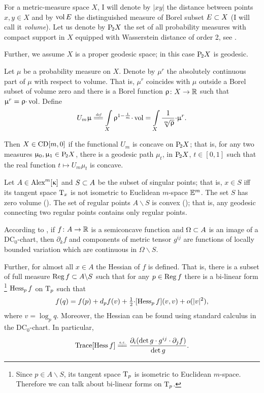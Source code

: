 \documentclass[oneside,a4paper]{article}
\begin{document}
For a metric-measure space $X$, 
I will denote 
by $|x y|$ the distance between points $x,y\in X$
and by $\mathop{\rm vol}\nolimits E$ the distinguished measure of Borel subset $E\subset X$ (I will call it \emph{volume}).
Let us denote by $\mathrm {P}_{\!2} X$ the set of all probability measures with compact support in $X$ equipped with Wasserstein distance of order 2, see \cite[6.1]{villani}.

Further, we assume $X$ is a proper geodesic space;
in this case $\mathrm {P}_{\!2} X$ is geodesic.

Let $\mu$ be a probability measure on $X$.
Denote by $\mu^{r}$ the absolutely continuous part of $\mu$ with respect to volume.
That is, 
$\mu^{r}$ coincides with $\mu$ outside a Borel subset of volume zero and
 there is a Borel function $\upvarrho\colon X\to\mathbb{R}$ such that $\mu^{r}\z=\rho{\cdot}\vol$.
Define
$$U_m\mu
\df
\int\limits_X\rho^{1-\frac1m}{\cdot}\vol
=
\int\limits_X\frac1{\sqrt[m]{\rho}}{\cdot}\mu^r.$$

Then $X\in \CD m0$ if the functional $U_m$ is concave on  $\mathrm {P}_{\!2} X$;
that is, for any two measures $\upmu_0,\upmu_1\in \mathrm {P}_{\!2} X$,
there is a geodesic path $\mu_t$, in $\mathrm {P}_{\!2} X$, $t\in[0,1]$ such that the real function $t\mapsto U_m\mu_t$ is concave.



Let $A\in\CBB m\kappa$ and $S\subset A$ be the subset of singular points;
that is, $x\in S$ iff its tangent space $\text{\rm T}_x$ is not isometric to Euclidean $m$-space $\mathbb{E}^m$. 
The set $S$ has zero volume (\cite[10.6]{BGP}).
The set of regular points $A\backslash S$ is convex (\cite{petrunin:parallel}); 
that is, any geodesic connecting two regular points contains only regular points.

According to \cite{perelman:DC},  
if $f\colon A\to\mathbb{R}$ is a semiconcave function 
and $\Omega\subset A$ is an image of a $\mathrm{DC}_0$-chart,
then
$\partial_k f$ and components of metric tensor $g^{i j}$ are functions of locally bounded variation which are continuous in $\Omega\backslash S$.

Further, for almost all $x\in A$ the Hessian of $f$ is defined.
That is, there is a subset of full measure $\mathop{\rm Reg}\nolimits f\subset A\backslash S$ such that for any $p\in \mathop{\rm Reg}\nolimits f$ there is a bi-linear form%
\footnote{Since $p\in A\backslash S$, its tangent space $\text{\rm T}_p$ is isometric to Euclidean $m$-space. Therefore we can talk about bi-linear forms on $\text{\rm T}_p$.}
 $\operatorname{Hess}_p f$ on $\text{\rm T}_p$ such that 
$$f(q)=f(p)+d_p f(v)+\tfrac12{\cdot}[\operatorname{Hess}_p f](v,v)+o(|v|^2),$$
where $v=\log_p q$.
Moreover, the Hessian can be found using standard calculus in the $\mathrm{DC}_0$-chart.
In particular,
$$\Trace[\Hess f]
\ae
\frac{\partial_i(\det g\cdot g^{i j}\cdot\partial_j f)}{\det g}.$$
\end{document}
